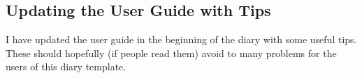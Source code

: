 \subsection{Updating the User Guide with Tips}
\label{task:20141008_jkn0}
I have updated the user guide in the beginning of the diary with some useful tips. These should hopefully (if people read them) avoid to many problems for the users of this diary template.
